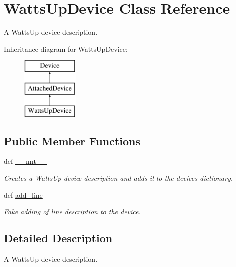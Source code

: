 \hypertarget{classsettings__classes_1_1_watts_up_device}{\section{\-Watts\-Up\-Device \-Class \-Reference}
\label{classsettings__classes_1_1_watts_up_device}
}


\-A \-Watts\-Up device description.  


\-Inheritance diagram for \-Watts\-Up\-Device\-:\begin{figure}[H]
\begin{center}
\leavevmode
\includegraphics[height=3.000000cm]{classsettings__classes_1_1_watts_up_device}
\end{center}
\end{figure}
\subsection*{\-Public \-Member \-Functions}
\begin{DoxyCompactItemize}
\item 
def \hyperlink{classsettings__classes_1_1_watts_up_device_ac775ee34451fdfa742b318538164070e}{\-\_\-\-\_\-init\-\_\-\-\_\-}
\begin{DoxyCompactList}\small\item\em \-Creates a \-Watts\-Up device description and adds it to the devices dictionary. \end{DoxyCompactList}\item 
def \hyperlink{classsettings__classes_1_1_watts_up_device_a9b24e7f6a176430603b1aec4ead55473}{add\-\_\-line}
\begin{DoxyCompactList}\small\item\em \-Fake adding of line description to the device. \end{DoxyCompactList}\end{DoxyCompactItemize}


\subsection{\-Detailed \-Description}
\-A \-Watts\-Up device description. 

